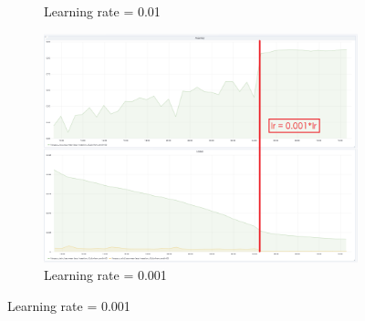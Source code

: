 \begin{figure}
\begin{subfigure}{.5\textwidth}
  \caption{Learning rate = 0.01}
  \label{fig:optin_001}
\end{subfigure}
\begin{subfigure}{.5\textwidth}
  \centering
  \includegraphics[width=.8\linewidth]{figures/04-opt_dunham_0001.PNG}
  \caption{Learning rate = 0.001}
  \label{fig:optim_0001}
\end{subfigure}
\end{figure}